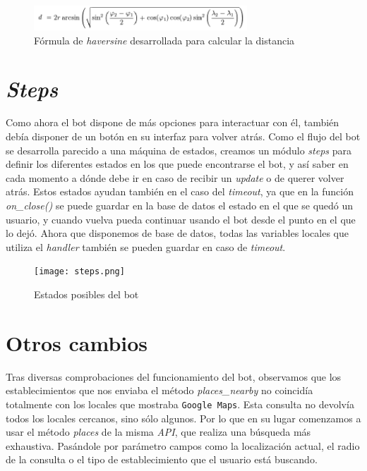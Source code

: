 \documentclass[oneside]{memoir}
\begin{document}
\begin{figure}[h!]
\centering
  \centering
  \includegraphics[width=80mm]{hav.png}
  \caption{Fórmula de \textit{haversine} desarrollada para calcular la distancia}
  \label{fig:hav}
\end{figure} 

\section{\textit{Steps}}
Como ahora el bot dispone de más opciones para interactuar con él, también debía disponer de un botón en su interfaz para volver atrás. Como el flujo del bot se desarrolla parecido a una máquina de estados, creamos un módulo \textit{steps} para definir los diferentes estados en los que puede encontrarse el bot, y así saber en cada momento a dónde debe ir en caso de recibir un \textit{update} o de querer volver atrás. Estos estados ayudan también en el caso del \textit{timeout}, ya que en la función \textit{on\_close()} se puede guardar en la base de datos el estado en el que se quedó un usuario, y cuando vuelva pueda continuar usando el bot desde el punto en el que lo dejó. Ahora que disponemos de base de datos, todas las variables locales que utiliza el \textit{handler} también se pueden guardar en caso de \textit{timeout}.

\begin{figure}[h!]
  \centering
  \texttt{[image: steps.png]}
  \caption{Estados posibles del bot}
  \label{fig:Estados posibles del bot}
\end{figure}

\section{Otros cambios}
Tras diversas comprobaciones del funcionamiento del bot, observamos que los establecimientos que nos enviaba el método \textit{places\_nearby} no coincidía totalmente con los locales que mostraba \texttt{Google Maps}. Esta consulta no devolvía todos los locales cercanos, sino sólo algunos. Por lo que en su lugar comenzamos a usar el método \textit{places} de la misma \textit{API}, que realiza una búsqueda más exhaustiva. Pasándole por parámetro campos como la localización actual, el radio de la consulta o el tipo de establecimiento que el usuario está buscando. 

\end{document}
